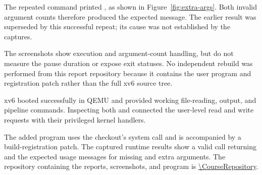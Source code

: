 \documentclass{../latex/utmreport}
\begin{document}
The repeated command  printed
, as shown in Figure~\ref{fig:extra-args}.
Both invalid argument counts therefore produced the expected message.
The earlier  result was superseded by this successful
repeat; its cause was not established by the captures.

The screenshots show execution and argument-count handling, but do not
measure the pause duration or expose exit statuses. No independent rebuild
was performed from this report repository because it contains the user
program and registration patch rather than the full xv6 source tree.

\utmconclusions
xv6 booted successfully in QEMU and provided working file-reading, output,
and pipeline commands. Inspecting both  and
 connected the user-level read and write requests
with their privileged kernel handlers.

The added  program uses the checkout's  system
call and is accompanied by a build-registration patch. The captured runtime
results show a valid call returning and the expected usage messages for
missing and extra arguments. The repository containing the reports,
screenshots, and program is \expandafter\url\expandafter{\CourseRepository}.
\end{document}
